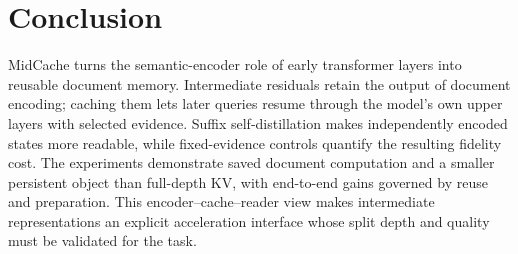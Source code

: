 \section{Conclusion}
\label{sec:conclusion}
MidCache turns the semantic-encoder role of early transformer layers into reusable document memory. Intermediate residuals retain the output of document encoding; caching them lets later queries resume through the model's own upper layers with selected evidence. Suffix self-distillation makes independently encoded states more readable, while fixed-evidence controls quantify the resulting fidelity cost. The experiments demonstrate saved document computation and a smaller persistent object than full-depth KV, with end-to-end gains governed by reuse and preparation. This encoder--cache--reader view makes intermediate representations an explicit acceleration interface whose split depth and quality must be validated for the task.
